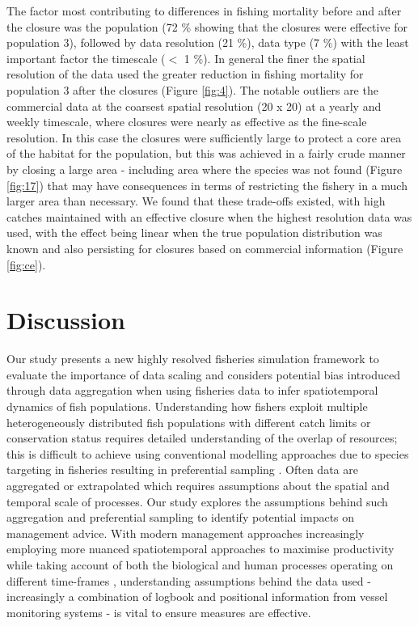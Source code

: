 \documentclass[review]{elsarticle}
\begin{document}
The factor most contributing to differences in fishing mortality before and
after the closure was the population (72 \% showing that the closures were
effective for population 3), followed by data resolution (21 \%), data type (7
\%) with the least important factor the timescale ($<$ 1 \%). In general the
finer the spatial resolution of the data used the greater reduction in fishing
mortality for population 3 after the closures (Figure \ref{fig:4}). The notable
outliers are the commercial data at the coarsest spatial resolution (20 x 20)
at a yearly and weekly timescale, where closures were nearly as effective as
the fine-scale resolution. In this case the closures were sufficiently large to
protect a core area of the habitat for the population, but this was achieved in
a fairly crude manner by closing a large area - including area where the
species was not found (Figure \ref{fig:17}) that may have consequences in terms
of restricting the fishery in a much larger area than necessary. We found that
these trade-offs existed, with high catches maintained with an effective
closure when the highest resolution data was used, with the effect being linear
when the true population distribution was known and also persisting for
closures based on commercial information (Figure \ref{fig:ce}).\\

\section{Discussion}

Our study presents a new highly resolved fisheries simulation framework to
evaluate the importance of data scaling and considers potential bias introduced
through data aggregation when using fisheries data to infer spatiotemporal
dynamics of fish populations. Understanding how fishers exploit multiple
heterogeneously distributed fish populations with different catch limits or
conservation status requires detailed understanding of the overlap of
resources; this is difficult to achieve using conventional modelling approaches
due to species targeting in fisheries resulting in preferential sampling
\citep{Martinez-Minaya2018}. Often data are aggregated or extrapolated which
requires assumptions about the spatial and temporal scale of processes. Our
study explores the assumptions behind such aggregation and preferential
sampling to identify potential impacts on management advice. With modern
management approaches increasingly employing more nuanced spatiotemporal
approaches to maximise productivity while taking account of both the biological
and human processes operating on different time-frames \citep{Dunn2016},
understanding assumptions behind the data used - increasingly a combination of
logbook and positional information from vessel monitoring systems - is vital to
ensure measures are effective. \\
\end{document}
